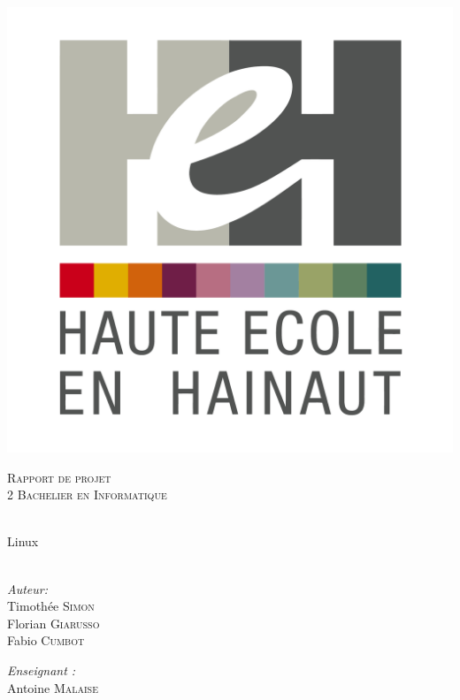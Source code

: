 \begin{center}
  \includegraphics[scale=0.12]{textures/logo/heh.pdf}

  \vspace{1cm}

  \textsc{\LARGE Rapport de projet} \\ [1cm]

  \textsc{\large 2 Bachelier en Informatique} \\ [0.2cm]

  \begingroup
   \selectfont 

  \HRule \\ [0.4cm] {
    \huge Linux \\ [0.2cm] 
  }
  \HRule \\ [1.3cm]
  \endgroup

  \begin{minipage}[t]{0.4 \textwidth} 
    \begin{flushleft} 
      \large \emph{Auteur:} \\ 
	  Timothée \textsc{Simon}\\
	  Florian \textsc{Giarusso}\\
	  Fabio \textsc{Cumbot}\\
    \end{flushleft} 
  \end{minipage}
  \begin{minipage}[t]{0.4 \textwidth}
    \begin{flushright} 
      \large \emph{Enseignant :} \\ 
      Antoine \textsc{Malaise}
    \end{flushright} 
  \end{minipage}


\end{center}
